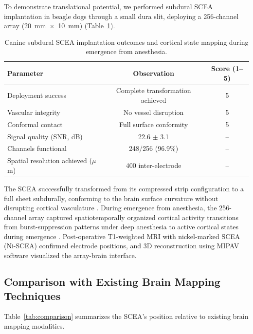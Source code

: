 \documentclass[11pt]{article}
\begin{document}
To demonstrate translational potential, we performed subdural SCEA implantation in beagle dogs through a small dura slit, deploying a 256-channel array (20~mm~$\times$~10~mm) (Table~\ref{tab:canine}).

\begin{table}[H]
\centering
\caption{Canine subdural SCEA implantation outcomes and cortical state mapping during emergence from anesthesia.}
\label{tab:canine}
\begin{tabular}{lcc}
\toprule
Parameter & Observation & Score (1--5) \\
\midrule
Deployment success & Complete transformation achieved & 5 \\
Vascular integrity & No vessel disruption & 5 \\
Conformal contact & Full surface conformity & 5 \\
Signal quality (SNR, dB) & 22.6 $\pm$ 3.1 & -- \\
Channels functional & 248/256 (96.9\%) & -- \\
Spatial resolution achieved ($\mu$m) & 400 inter-electrode & -- \\
\bottomrule
\end{tabular}
\end{table}

The SCEA successfully transformed from its compressed strip configuration to a full sheet subdurally, conforming to the brain surface curvature without disrupting cortical vasculature \citep{canine_neuro_model2019}. During emergence from anesthesia, the 256-channel array captured spatiotemporally organized cortical activity transitions from burst-suppression patterns under deep anesthesia to active cortical states during emergence \citep{anesthesia_cortical2018}. Post-operative T1-weighted MRI with nickel-marked SCEA (Ni-SCEA) confirmed electrode positions, and 3D reconstruction using MIPAV software \citep{mipav_software2007} visualized the array-brain interface.

\subsection{Comparison with Existing Brain Mapping Techniques}

Table~\ref{tab:comparison} summarizes the SCEA's position relative to existing brain mapping modalities.
\end{document}
